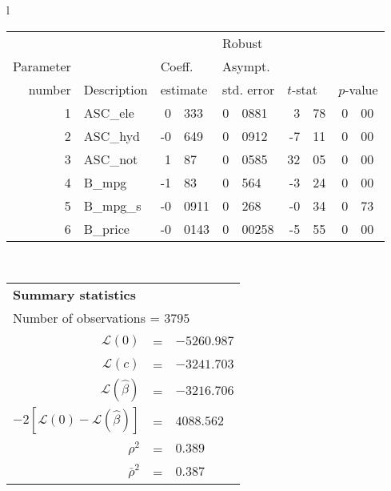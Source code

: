   \begin{tabular}{l}
\begin{tabular}{rlr@{.}lr@{.}lr@{.}lr@{.}l}
         &                       &   \multicolumn{2}{l}{}    & \multicolumn{2}{l}{Robust}  &     \multicolumn{4}{l}{}   \\
Parameter &                       &   \multicolumn{2}{l}{Coeff.}      & \multicolumn{2}{l}{Asympt.}  &     \multicolumn{4}{l}{}   \\
number &  Description                     &   \multicolumn{2}{l}{estimate}      & \multicolumn{2}{l}{std. error}  &   \multicolumn{2}{l}{$t$-stat}  &   \multicolumn{2}{l}{$p$-value}   \\

\hline

1 & ASC\_ele & 0&333 & 0&0881 & 3&78 & 0&00 \\
2 & ASC\_hyd & -0&649 & 0&0912 & -7&11 & 0&00 \\
3 & ASC\_not & 1&87 & 0&0585 & 32&05 & 0&00 \\
4 & B\_mpg & -1&83 & 0&564 & -3&24 & 0&00 \\
5 & B\_mpg\_s & -0&0911 & 0&268 & -0&34 & 0&73 \\
6 & B\_price & -0&0143 & 0&00258 & -5&55 & 0&00 \\
\hline

\end{tabular}
\\
\begin{tabular}{rcl}
\multicolumn{3}{l}{\bf Summary statistics}\\
\multicolumn{3}{l}{ Number of observations = $3795$} \\
 $\mathcal{L}(0)$ &=&  $-5260.987$ \\
 $\mathcal{L}(c)$ &=& $-3241.703$\\
 $\mathcal{L}(\hat{\beta})$ &=& $-3216.706 $  \\
 $-2[\mathcal{L}(0) -\mathcal{L}(\hat{\beta})]$ &=& $4088.562$ \\
    $\rho^2$ &=&   $0.389$ \\
    $\bar{\rho}^2$ &=&    $0.387$ \\
\end{tabular}
\end{tabular}

